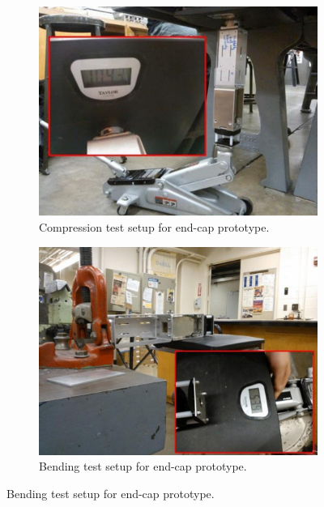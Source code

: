 \documentclass[12pt]{report}
\begin{document}
\begin{figure}[hbt]
  \begin{center}
    \begin{subfigure}[b]{0.45\textwidth}
      \includegraphics[width=1\textwidth]{./img/compression_test.jpg}
      \caption{Compression test setup for end-cap prototype.}
      \label{endcap_compression_test_experimental}
    \end{subfigure}
    \begin{subfigure}[b]{0.45\textwidth}
      \includegraphics[width=1\textwidth]{./img/bending_test.jpg}
      \caption{Bending test setup for end-cap prototype.}
      \label{endcap_bending_test_experimental}
    \end{subfigure}
  \end{center}
\end{figure}
\end{document}

